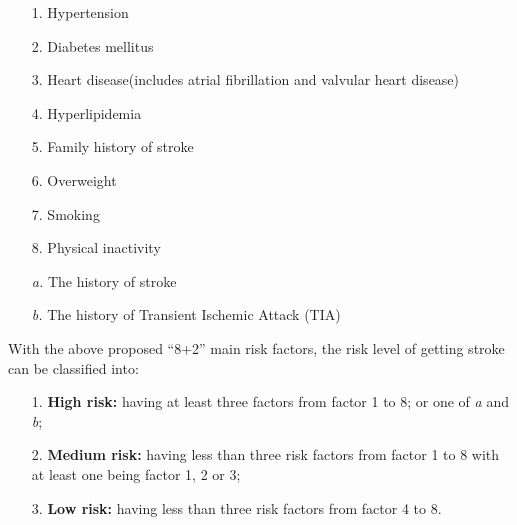 \documentclass{article}
\begin{document}
\begin{itemize}\label{factor:main-risk-factor}
    \setlength{\itemsep}{0pt}
    \setlength{\parsep}{0pt}
    \setlength{\parskip}{0pt}
    \item[1.] Hypertension
    \item[2.] Diabetes mellitus
    \item[3.] Heart disease(includes atrial fibrillation and valvular heart disease)
    \item[4.] Hyperlipidemia
    \item[5.] Family history of stroke
    \item[6.] Overweight
    \item[7.] Smoking
    \item[8.] Physical inactivity  
    \item[\textit{a.}] The history of stroke
    \item[\textit{b.}] The history of Transient Ischemic Attack (TIA)
\end{itemize}

With the above proposed ``8+2'' main risk factors, the risk level of getting stroke can be classified into:
\begin{itemize}
  \item[1.] \textbf{High risk:} having at least three factors from factor 1 to 8; or one of \textit{a} and \textit{b};
  \item[2.] \textbf{Medium risk:} having less than three risk factors from factor 1 to 8 with at least one being factor 1, 2 or 3; 
  \item[3.] \textbf{Low risk:} having less than three risk factors from factor 4 to 8.
\end{itemize}
 
\end{document}
